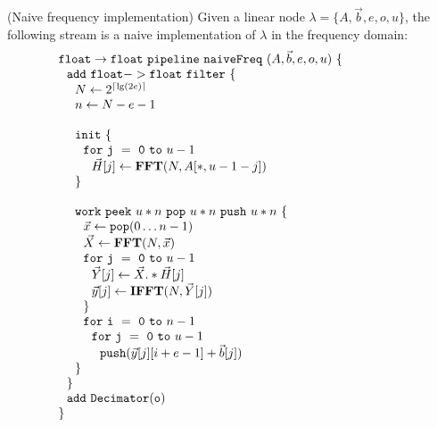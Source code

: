 \begin{transformation} (Naive frequency implementation)
Given a linear node $\lambda = \{A, {\vec b}, e, o, u\}$, the
following stream is a naive implementation of $\lambda$ in the
frequency domain: \\
\begin{equation} \nonumber
  \begin{array}{ll}

    {\tt float \rightarrow float}~{\tt pipeline~naiveFreq~}(A, {\vec b}, e, o, u){\tt ~\{} & \hspace{40pt}\\
    ~~{\tt add~float->float~filter~\{}\\
    ~~~~N \leftarrow 2^{\lceil \lg(2e) \rceil} \\
    ~~~~n \leftarrow N-e-1 \\
    \\
    ~~~~{\tt init}~{\tt \{} \\
    ~~~~~~{\tt for~j~=~0~to~}u-1\\
    ~~~~~~~~\vec{H}[j] \leftarrow \mathbf{FFT}(N,A[*,u-1-j]) \\
    ~~~~{\tt \}} \\
    \\
    ~~~~{\tt work}~{\tt peek}~u*n~{\tt pop}~u*n~{\tt push}~u*n~{\tt \{} \\
    ~~~~~~\vec{x} \leftarrow {\tt pop}(0 \dots n - 1) \\
    ~~~~~~\vec{X} \leftarrow \mathbf{FFT} (N, \vec{x}) \\
    ~~~~~~{\tt for~j~=~0~to~}u-1\\
    ~~~~~~~~\vec{Y}[j] \leftarrow \vec{X} .* \vec{H}[j] \\
    ~~~~~~~~\vec{y}[j] \leftarrow \mathbf{IFFT}(N, \vec{Y}[j]) \\
    ~~~~~~{\tt \}} \\
    ~~~~~~{\tt for~i~=~0~to~}n-1\\
    ~~~~~~~~{\tt for~j~=~0~to~}u-1\\
    ~~~~~~~~~~{\tt push}(\vec{y}[j][i+e-1] + {\vec b}[j])\\
    ~~~~{\tt \}} \\
    ~~{\tt \}} \\
    ~~{\tt add~Decimator(o)} \\
    {\tt \}} \\
  \end{array}
\end{equation}
\label{trans:freq1}
\end{transformation}

